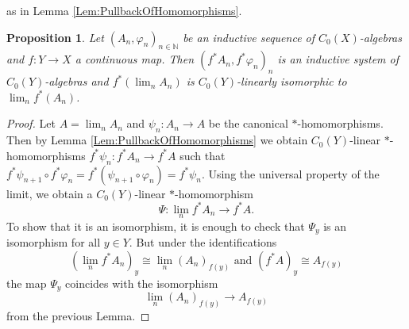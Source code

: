 \documentclass[reqno,oneside,a4paper,11pt]{amsart}
\theoremstyle{theorem}
\newtheorem{prop}[satz]{Proposition}
\theoremstyle{definition}
\newcommand{\NN}{\mathbb N}
\begin{document}
	as in Lemma \ref{Lem:PullbackOfHomomorphisms}. 
	\begin{prop}\label{Prop:LimitsAndPullbacks}
		Let $(A_n,\varphi_n)_{n\in\NN}$ be an inductive sequence of $C_0(X)$-al\-gebras and $f:Y\rightarrow X$ a continuous map.
		Then $(f^*A_n,f^*\varphi_n)_{n}$ is an inductive system of $C_0(Y)$-algebras and $f^*(\lim_n A_n)$ is $C_0(Y)$-linearly isomorphic to $\lim_n f^*(A_n)$.
	\end{prop}
	\begin{proof}
		Let $A=\lim_n A_n$ and $\psi_n:A_n\rightarrow A$ be the canonical $\ast$-homo\-morphisms. Then by Lemma \ref{Lem:PullbackOfHomomorphisms} we obtain $C_0(Y)$-linear $*$-homo\-morphisms $f^*\psi_n:f^*A_n\rightarrow f^*A$ such that $f^*\psi_{n+1}\circ f^*\varphi_n=f^*(\psi_{n+1}\circ \varphi_n)=f^*\psi_n$. Using the universal property of the limit, we obtain a $C_0(Y)$-linear $*$-homo\-morphism $$\Psi:\lim\limits_{n}f^*A_n\rightarrow f^*A.$$
		To show that it is an isomorphism, it is enough to check that $\Psi_y$ is an isomorphism for all $y\in Y$. But under the identifications
		$$(\lim_{n}f^*A_n)_y\cong \lim_{n}(A_n)_{f(y)}\text{ and }(f^*A)_y\cong A_{f(y)}$$ the map $\Psi_y$ coincides with the isomorphism 
		$$\lim\limits_{n}(A_n)_{f(y)}\rightarrow A_{f(y)}$$
		from the previous Lemma.
	\end{proof}
	
\end{document}
